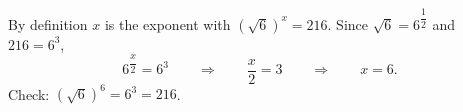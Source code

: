 By definition $x$ is the exponent with $(\sqrt6)^x=216$. Since $\sqrt6=6^{\dfrac{1}{2}}$ and $216=6^3$,
\[
6^{\dfrac {x}{2}}=6^3\qquad\Longrightarrow\qquad\dfrac {x}{2}=3\qquad\Longrightarrow\qquad x=\boxed{6}.
\]
Check: $(\sqrt6)^6=6^3=216$.
